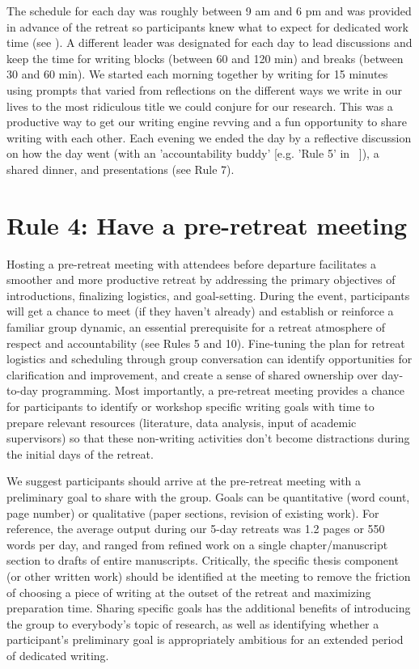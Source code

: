 \documentclass[10pt,letterpaper]{article}
\begin{document}
The schedule for each day was roughly between 9 am and 6 pm and was provided in advance of the retreat so participants knew what to expect for dedicated work time (see ). A different leader was designated for each day to lead discussions and keep the time for writing blocks (between 60 and 120 min) and breaks (between 30 and 60 min). We started each morning together by writing for 15 minutes using prompts that varied from reflections on the different ways we write in our lives to the most ridiculous title we could conjure for our research. This was a productive way to get our writing engine revving and a fun opportunity to share writing with each other. Each evening we ended the day by a reflective discussion on how the day went (with an 'accountability buddy' [e.g. 'Rule 5' in ~\cite{peterson2018}]), a shared dinner, and presentations (see Rule 7).

\section*{Rule 4: Have a pre-retreat meeting}

Hosting a pre-retreat meeting with attendees before departure facilitates a smoother and more productive retreat by addressing the primary objectives of introductions, finalizing logistics, and goal-setting. During the event, participants will get a chance to meet (if they haven’t already) and establish or reinforce a familiar group dynamic, an essential prerequisite for a retreat atmosphere of respect and accountability (see Rules 5 and 10). Fine-tuning the plan for retreat logistics and scheduling through group conversation can identify opportunities for clarification and improvement, and create a sense of shared ownership over day-to-day programming. Most importantly, a pre-retreat meeting provides a chance for participants to identify or workshop specific writing goals with time to prepare relevant resources (literature, data analysis, input of academic supervisors) so that these non-writing activities don't become distractions during the initial days of the retreat.

We suggest participants should arrive at the pre-retreat meeting with a preliminary goal to share with the group. Goals can be quantitative (word count, page number) or qualitative (paper sections, revision of existing work). For reference, the average output during our 5-day retreats was 1.2 pages or 550 words per day, and ranged from refined work on a single chapter/manuscript section to drafts of entire manuscripts. Critically, the specific thesis component (or other written work) should be identified at the meeting to remove the friction of choosing a piece of writing at the outset of the retreat and maximizing preparation time. Sharing specific goals has the additional benefits of introducing the group to everybody's topic of research, as well as identifying whether a participant's preliminary goal is appropriately ambitious for an extended period of dedicated writing.
\end{document}
